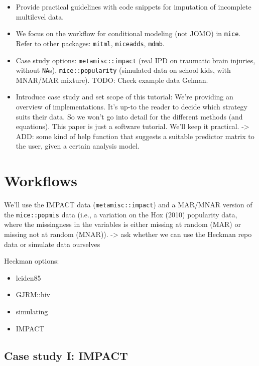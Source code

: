 \documentclass[
]{jss}
\begin{document}
\begin{itemize}
\item
  Provide practical guidelines with code snippets for imputation of
  incomplete multilevel data.
\item
  We focus on the workflow for conditional modeling (not JOMO) in
  \texttt{mice}. Refer to other packages: \texttt{mitml},
  \texttt{miceadds}, \texttt{mdmb}.
\item
  Case study options: \texttt{metamisc::impact} (real IPD on traumatic
  brain injuries, without \texttt{NA}s), \texttt{mice::popularity}
  (simulated data on school kids, with MNAR/MAR mixture). TODO: Check
  example data Gelman.
\item
  Introduce case study and set scope of this tutorial: We're providing
  an overview of implementations. It's up-to the reader to decide which
  strategy suits their data. So we won't go into detail for the
  different methods (and equations). This paper is just a software
  tutorial. We'll keep it practical. -\textgreater{} ADD: some kind of
  help function that suggests a suitable predictor matrix to the user,
  given a certain analysis model.
\end{itemize}

\hypertarget{workflows}{%
\section{Workflows}\label{workflows}}

We'll use the IMPACT data (\texttt{metamisc::impact}) and a MAR/MNAR
version of the \texttt{mice::popmis} data (i.e., a variation on the Hox
(2010) popularity data, where the missingness in the variables is either
missing at random (MAR) or missing not at random (MNAR)).
-\textgreater{} ask whether we can use the Heckman repo data or simulate
data ourselves

Heckman options:

\begin{itemize}
\item
  leiden85
\item
  GJRM::hiv
\item
  simulating
\item
  IMPACT
\end{itemize}

\hypertarget{case-study-i-impact}{%
\subsection{Case study I: IMPACT}\label{case-study-i-impact}}
\end{document}
